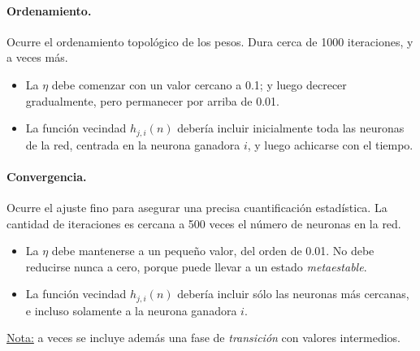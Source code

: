 \documentclass[10pt,a4paper]{article}
\begin{document}
\begin{multicols}{2}
\paragraph{Ordenamiento.} Ocurre el ordenamiento topológico de los pesos. Dura cerca de 1000 iteraciones, y a veces más.
\begin{itemize}
\item La $\eta$ debe comenzar con un valor cercano a 0.1; y luego decrecer gradualmente, pero permanecer por arriba de 0.01.
\item La función vecindad $h_{j,i}(n)$ debería incluir inicialmente toda las neuronas de la red, centrada en la neurona ganadora $i$, y luego achicarse con el tiempo.
\end{itemize}

\paragraph{Convergencia.} Ocurre el ajuste fino para asegurar una precisa cuantificación estadística. La cantidad de iteraciones es cercana a 500 veces el número de neuronas en la red.
\begin{itemize}
\item La $\eta$ debe mantenerse a un pequeño valor, del orden de 0.01. No debe reducirse nunca a cero, porque puede llevar a un estado \textit{metaestable}.
\item La función vecindad $h_{j,i}(n)$ debería incluir sólo las neuronas más cercanas, e incluso solamente a la neurona ganadora $i$.
\end{itemize}
\end{multicols}

\underline{Nota:} a veces se incluye además una fase de \textit{transición} con valores intermedios.

\end{document}
